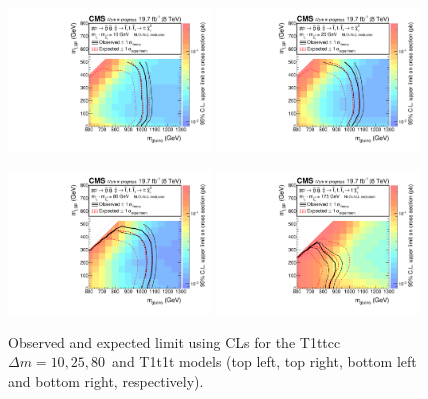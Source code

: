 \begin{figure}[p]
\centering
\includegraphics[width=0.48\textwidth]{figures/razor_interpretation/Boost_T1ttcc_DM10_BPS_XSEC}
\includegraphics[width=0.48\textwidth]{figures/razor_interpretation/Boost_T1ttcc_DM25_BPS_XSEC}

\includegraphics[width=0.48\textwidth]{figures/razor_interpretation/Boost_T1ttcc_DM80_BPS_XSEC}
\includegraphics[width=0.48\textwidth]{figures/razor_interpretation/Boost_T1t1t_BPS_XSEC}
\caption{Observed and expected limit using CLs for the T1ttcc $\Delta m=10,25,80$~\GeV and T1t1t
models (top left, top right, bottom left and bottom right, respectively). 
\label{fig:boost_limits}}
\end{figure}

